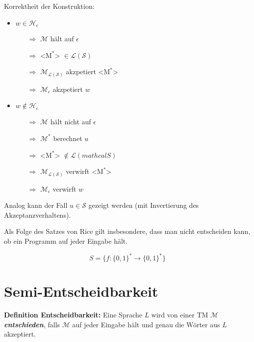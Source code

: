 \documentclass{scrartcl}%
\begin{document}
    Korrektheit der Konstruktion:
    \begin{itemize}
        \item $w \in \mathcal{H}_\epsilon$
        \begin{itemize}
            \item [$\Rightarrow$] $\mathcal{M}$ hält auf $\epsilon$
            \item [$\Rightarrow$] <$\text{M}^*$> $\in \mathcal{L}(\mathcal{S})$
            \item [$\Rightarrow$] $\mathcal{M}_{\mathcal{L}(\mathcal{S})}$ akzpetiert <$\text{M}^*$>
            \item [$\Rightarrow$] $\mathcal{M}_{\epsilon}$ akzpetiert $w$
        \end{itemize}
        \item $w \notin \mathcal{H}_\epsilon$
        \begin{itemize}
            \item [$\Rightarrow$] $\mathcal{M}$ hält nicht auf $\epsilon$
            \item [$\Rightarrow$] $\mathcal{M}^*$ berechnet $u$
            \item [$\Rightarrow$] <$\text{M}^*$> $\notin \mathcal{L}(mathcal{S})$
            \item [$\Rightarrow$] $\mathcal{M}_{\mathcal{L}(\mathcal{S})}$ verwirft <$\text{M}^*$>
            \item [$\Rightarrow$] $\mathcal{M}_{\epsilon}$ verwirft $w$
        \end{itemize}
    \end{itemize}

    Analog kann der Fall $u \in \mathcal{S}$ gezeigt werden (mit Invertierung des Akzeptanzverhaltens).\proofend

    \vspace*{0.3cm}
    Als Folge des Satzes von Rice gilt insbesondere, dass man nicht entscheiden kann,
    ob ein Programm auf jeder Eingabe hält.

    \begin{equation*}
        S = \{ f: \{0,1\}^* \rightarrow \{0,1\}^* \}
    \end{equation*}

    \section*{Semi-Entscheidbarkeit}

    \textbf{\textsf{Definition Entscheidbarkeit:}}
    Eine Sprache $L$ wird von einer TM $\mathcal{M}$ \textit{\textbf{\textsf{entschieden}}}, falls $\mathcal{M}$ auf jeder Eingabe hält und genau die Wörter aus $L$ akzeptiert.
\end{document}
